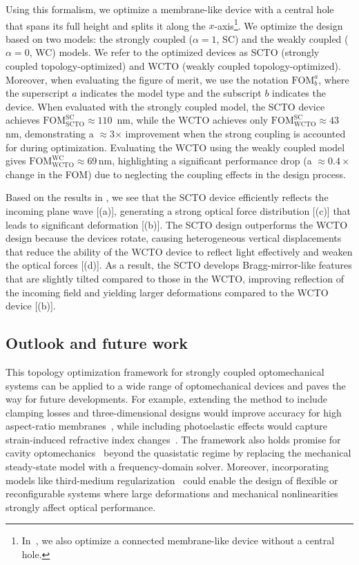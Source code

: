 Using this formalism, we optimize a membrane-like device with a central hole that spans its full height and splits it along the $x$-axis\footnote{In~\cite{ownpub5}, we also optimize a connected membrane-like device without a central hole.}. We optimize the design based on two models: the strongly 
coupled ($\alpha = 1$, SC) and the weakly coupled ($\alpha = 0$, WC) models. We refer to the optimized devices as SCTO 
(strongly coupled topology-optimized) and WCTO (weakly coupled topology-optimized). Moreover, when evaluating the 
figure of merit, we use the notation $\text{FOM}^a_b$, where the superscript $a$ indicates the model type and the subscript $b$ indicates the device. 
When evaluated with the strongly coupled model, the SCTO device achieves $\text{FOM}^\text{SC}_\text{SCTO}\approx 110$\, nm, while the WCTO achieves only
$\text{FOM}^\text{SC}_\text{WCTO}\approx 43$\,nm, demonstrating a $\approx$3$\times$ improvement when the strong coupling
 is accounted for during optimization. Evaluating the WCTO using the
 weakly coupled model gives $\text{FOM}^\text{WC}_\text{WCTO}\approx$69\,nm, highlighting
 a significant performance drop (a $\approx 0.4 \times$ change in the FOM) due to neglecting the coupling effects in the design process. 
        
        
 Based on the results in , we see that the SCTO device efficiently reflects
 the incoming plane wave [(a)], generating a strong optical force distribution
 [(c)] that leads to significant deformation [(b)]. 
 The SCTO design outperforms the WCTO design because the devices rotate, causing heterogeneous
 vertical displacements that reduce the ability of the WCTO device to reflect light effectively and weaken the
 optical forces [(d)]. As a result, the SCTO develops Bragg-mirror-like features
 that are slightly tilted compared to those in the WCTO, improving reflection of the incoming field
 and yielding larger deformations compared to the WCTO device [(b)].
        

\subsection*{Outlook and future work}
This topology optimization framework for strongly coupled optomechanical systems can be applied to a wide
 range of optomechanical devices and paves the way for future developments. 
 For example, extending the method to include clamping losses and three-dimensional designs
  would improve accuracy for high aspect-ratio membranes~\cite{aspect_ratio}, while including
   photoelastic effects would capture strain-induced refractive index changes~\cite{photoelasticity}.
    The framework also holds promise for cavity optomechanics~\cite{cav_opt} beyond the quasistatic
     regime by replacing the mechanical steady-state model with a frequency-domain solver. 
     Moreover, incorporating models like third-medium regularization~\cite{HuHu0} could enable the design of
      flexible or reconfigurable systems where large deformations and mechanical nonlinearities
       strongly affect optical performance.

